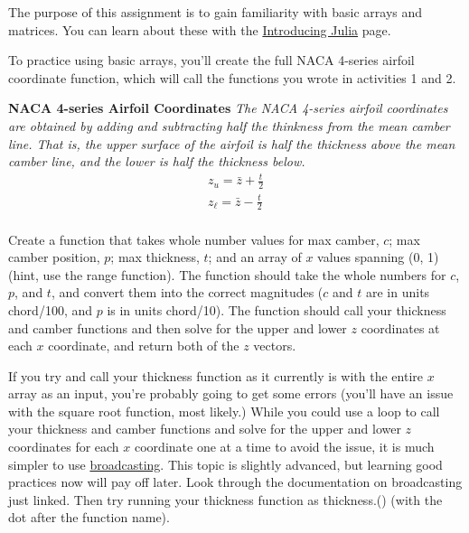 \documentclass{article}%
\begin{document}
The purpose of this assignment is to gain familiarity with basic arrays and matrices. You can learn about these with the \href{https://en.wikibooks.org/wiki/Introducing_Julia/Arrays_and_tuples}{Introducing Julia} page.

\bigskip

To practice using basic arrays, you'll create the full NACA 4-series airfoil coordinate function, which will call the functions you wrote in activities 1 and 2.

\bigskip

\begin{tcolorbox}
	\textbf{
		NACA 4-series Airfoil Coordinates}
	\textit{
		The NACA 4-series airfoil coordinates are obtained by adding and subtracting half the thinkness from the mean camber line. That is, the upper surface of the airfoil is half the thickness above the mean camber line, and the lower is half the thickness below.
	}
	\begin{align*}
	z_u = \bar{z} + \frac{t}{2}\\
	z_\ell = \bar{z} - \frac{t}{2}\\
	\end{align*}
	
\end{tcolorbox}

\bigskip

Create a function that takes whole number values for max camber, $c$; max camber position, $p$; max thickness, $t$; and an array of $x$ values spanning (0, 1) (hint, use the range function). The function should take the whole numbers for $c$, $p$, and $t$, and convert them into the correct magnitudes ($c$ and $t$ are in units chord/100, and $p$ is in units chord/10). The function should call your thickness and camber functions and then solve for the upper and lower $z$ coordinates at each $x$ coordinate, and return both of the $z$ vectors.

If you try and call your thickness function as it currently is with the entire $x$ array as an input, you're probably going to get some errors (you'll have an issue with the square root function, most likely.) While you could use a loop to call your thickness and camber functions and solve for the upper and lower $z$ coordinates for each $x$ coordinate one at a time to avoid the issue, it is much simpler to use \href{https://docs.julialang.org/en/v1/base/arrays/index.html#Broadcast-and-vectorization-1}{broadcasting}. This topic is slightly advanced, but learning good practices now will pay off later.  Look through the documentation on broadcasting just linked. Then try running your thickness function as thickness.() (with the dot after the function name).
\end{document}
